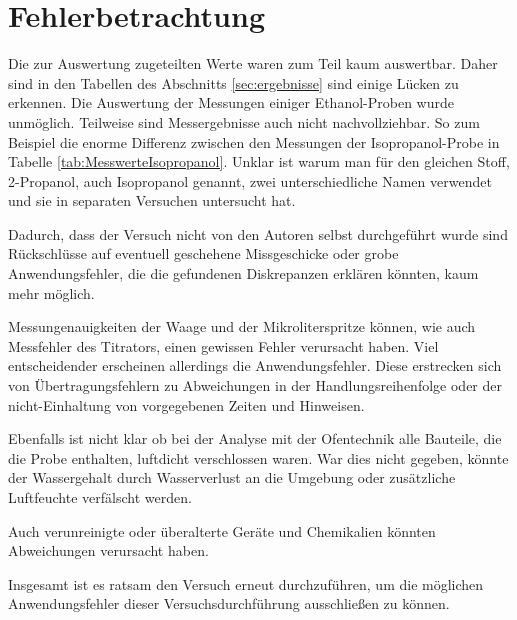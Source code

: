 \section{Fehlerbetrachtung}
\label{sec:fehler}

Die zur Auswertung zugeteilten Werte waren zum Teil kaum auswertbar. Daher sind in den Tabellen des Abschnitts \ref{sec:ergebnisse} sind einige Lücken zu erkennen. Die Auswertung der Messungen einiger Ethanol-Proben wurde unmöglich. Teilweise sind Messergebnisse auch nicht nachvollziehbar. So zum Beispiel die enorme Differenz zwischen den Messungen der Isopropanol-Probe in Tabelle \ref{tab:MesswerteIsopropanol}. Unklar ist warum man für den gleichen Stoff, 2-Propanol, auch Isopropanol genannt, zwei unterschiedliche Namen verwendet und sie in separaten Versuchen untersucht hat. 

Dadurch, dass der Versuch nicht von den Autoren selbst durchgeführt wurde sind Rückschlüsse auf eventuell geschehene Missgeschicke oder grobe Anwendungsfehler, die die gefundenen Diskrepanzen erklären könnten, kaum mehr möglich. 

Messungenauigkeiten der Waage und der Mikroliterspritze können, wie auch Messfehler des Titrators, einen gewissen Fehler verursacht haben. Viel entscheidender erscheinen allerdings die Anwendungsfehler. Diese erstrecken sich von Übertragungsfehlern zu Abweichungen in der Handlungsreihenfolge oder der nicht-Einhaltung von vorgegebenen Zeiten und Hinweisen.

Ebenfalls ist nicht klar ob bei der Analyse mit der Ofentechnik alle Bauteile, die die Probe enthalten, luftdicht verschlossen waren. War dies nicht gegeben, könnte der Wassergehalt durch Wasserverlust an die Umgebung oder zusätzliche Luftfeuchte verfälscht werden.

Auch verunreinigte oder überalterte Geräte und Chemikalien könnten Abweichungen verursacht haben.

Insgesamt ist es ratsam den Versuch erneut durchzuführen, um die möglichen Anwendungsfehler dieser Versuchsdurchführung ausschließen zu können.